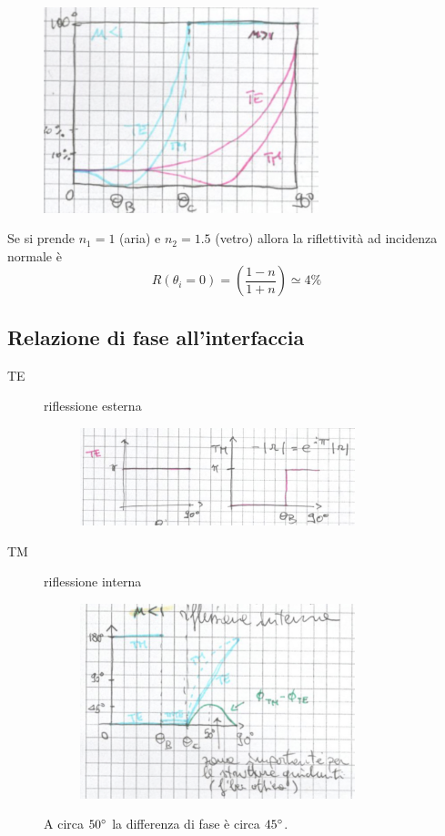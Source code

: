 \documentclass{article}
\begin{document}
\begin{figure}[H]
\includegraphics[width=8cm]{images/R_int_ext.png}
\centering
\end{figure}
\noindent
Se si prende $n_1 = 1$ (aria) e $n_2 = 1.5$ (vetro) allora la riflettività ad incidenza normale è
\begin{equation*}
R(\theta_i=0) = \left(\frac{1 - n}{1 + n}\right) \simeq 4\%
\end{equation*}

\subsection{Relazione di fase all'interfaccia}
\begin{description}
\item [TE] riflessione esterna
\begin{figure}[H]
\includegraphics[width=8cm]{images/ext_rifl_fase.png}
\centering
\end{figure}
\item [TM] riflessione interna
\begin{figure}[H]
\includegraphics[width=8cm]{images/int_rifl_fase.png}
\centering
\end{figure}
\noindent
A circa $50\degree$ la differenza di fase è circa $45\degree$.
\end{description}
\end{document}

